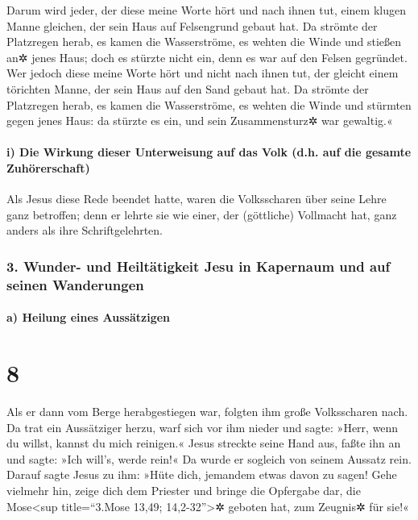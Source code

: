  Darum wird jeder, der diese meine Worte hört und nach
ihnen tut, einem klugen Manne gleichen, der sein Haus auf Felsengrund
gebaut hat.  Da strömte der Platzregen herab, es kamen
die Wasserströme, es wehten die Winde und stießen an✲ jenes Haus; doch
es stürzte nicht ein, denn es war auf den Felsen gegründet.
 Wer jedoch diese meine Worte hört und nicht nach ihnen
tut, der gleicht einem törichten Manne, der sein Haus auf den Sand
gebaut hat.  Da strömte der Platzregen herab, es kamen
die Wasserströme, es wehten die Winde und stürmten gegen jenes Haus: da
stürzte es ein, und sein Zusammensturz✲ war gewaltig.«

\hypertarget{i-die-wirkung-dieser-unterweisung-auf-das-volk-d.h.-auf-die-gesamte-zuhuxf6rerschaft}{%
\paragraph{i) Die Wirkung dieser Unterweisung auf das Volk (d.h. auf die
gesamte
Zuhörerschaft)}\label{i-die-wirkung-dieser-unterweisung-auf-das-volk-d.h.-auf-die-gesamte-zuhuxf6rerschaft}}

 Als Jesus diese Rede beendet hatte, waren die
Volksscharen über seine Lehre ganz betroffen;  denn er
lehrte sie wie einer, der (göttliche) Vollmacht hat, ganz anders als
ihre Schriftgelehrten.

\hypertarget{wunder--und-heiltuxe4tigkeit-jesu-in-kapernaum-und-auf-seinen-wanderungen}{%
\subsubsection{3. Wunder- und Heiltätigkeit Jesu in Kapernaum und auf
seinen
Wanderungen}\label{wunder--und-heiltuxe4tigkeit-jesu-in-kapernaum-und-auf-seinen-wanderungen}}

\hypertarget{a-heilung-eines-aussuxe4tzigen}{%
\paragraph{a) Heilung eines
Aussätzigen}\label{a-heilung-eines-aussuxe4tzigen}}

\hypertarget{section-7}{%
\section{8}\label{section-7}}

 Als er dann vom Berge herabgestiegen war, folgten ihm
große Volksscharen nach.  Da trat ein Aussätziger herzu,
warf sich vor ihm nieder und sagte: »Herr, wenn du willst, kannst du
mich reinigen.«  Jesus streckte seine Hand aus, faßte ihn
an und sagte: »Ich will's, werde rein!« Da wurde er sogleich von seinem
Aussatz rein.  Darauf sagte Jesus zu ihm: »Hüte dich,
jemandem etwas davon zu sagen! Gehe vielmehr hin, zeige dich dem
Priester und bringe die Opfergabe dar, die Mose\textless sup
title=``3.Mose 13,49; 14,2-32''\textgreater✲ geboten hat, zum Zeugnis✲
für sie!«

